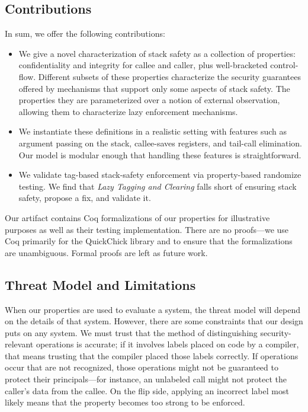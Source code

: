 \documentclass[10pt,conference]{ieeetran}%
\theoremstyle{definition}
\begin{document}
\subsection{Contributions}

In sum, we offer the following contributions:

\begin{itemize}
\item We give a novel characterization of stack safety as a collection
of properties: confidentiality and integrity for callee and caller,
plus well-bracketed control-flow. Different subsets of these
properties characterize the security guarantees offered by mechanisms
that support only some aspects of stack safety.  The properties they are parameterized over a notion of
external observation, allowing them to characterize lazy enforcement
mechanisms.
\item We instantiate these definitions in a realistic
setting with features such as
argument passing on the stack, callee-saves registers, and tail-call
elimination.  Our model is
modular enough that handling these features is straightforward.
\item We validate tag-based stack-safety enforcement via
property-based randomize testing. We find that \emph{Lazy Tagging and
  Clearing} falls short of ensuring stack safety, propose a fix, and
validate it.
\end{itemize}

Our artifact contains Coq formalizations of our properties for illustrative purposes
as well as their testing implementation. There are no proofs---we use Coq primarily
for the QuickChick library and to ensure that the formalizations are unambiguous.
Formal proofs are left as future work.

\subsection{Threat Model and Limitations}

When our properties are used to evaluate a system, the threat model will depend on the
details of that system. However, there are some constraints that our design puts on
any system. We must trust that the method of distinguishing security-relevant operations is accurate; if it
involves labels placed on code by a compiler, that means trusting that the compiler placed
those labels correctly. If operations occur that are not recognized, those operations
might not be guaranteed to protect their principals---for instance, an unlabeled call
might not protect the caller's data from the callee. On the flip side, applying an incorrect
label most likely means that the property becomes too strong to be enforced.
\end{document}
